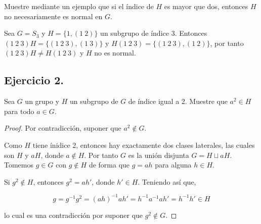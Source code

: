 \documentclass[11pt,letterpaper]{article}
\begin{document}
Muestre mediante un ejemplo que si el índice de $H$ es mayor que dos, entonces $H$ no necesariamente
es normal en $G$.

Sea $G = S_3$ y $H = \{ 1, (1 \ 2) \}$ un subgrupo de índice 3. Entonces
$(1 \ 2 \ 3)H = \{ (1 \ 2 \ 3), (1 \ 3) \}$ y $H(1 \ 2 \ 3) = \{ (1 \ 2 \ 3), (1 \ 2) \}$,
por tanto $(1 \ 2 \ 3) H \not= H(1 \ 2 \ 3)$ y $H$ no es normal.


\subsection*{Ejercicio 2.}
Sea $G$ un grupo y $H$ un subgrupo de $G$ de índice igual a 2. Muestre que
$a^2 \in H$ para todo $a \in G$.

\begin{proof} Por contradicción, suponer que $a^2 \notin G$.
    
    Como $H$ tiene ínidice 2, entonces hay exactamente dos clases laterales, las cuales son $H$ y
    $aH$, donde $a \notin H$. Por tanto $G$ es la unión disjunta $G = H \sqcup aH$. Tomemos $g \in G$
    con $g \notin H$ de forma que $g = ah$ para alguna $h \in H$.

    Si $g^2 \notin H$, entonces $g^2 = ah'$, donde $h' \in H$. Teniendo así que,

    \[ g = g^{-1}g^2 = (ah)^{-1}ah' = h^{-1}a^{-1}ah' = h^{-1}h' \in H \]

    lo cual es una contradicción por suponer que $g^2 \notin G$.
\end{proof}
\end{document}
